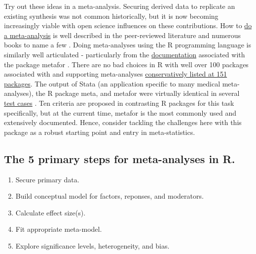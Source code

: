 \documentclass[
]{book}
\providecommand{\tightlist}{%
  \setlength{\itemsep}{0pt}\setlength{\parskip}{0pt}}
\begin{document}
Try out these ideas in a meta-analysis. Securing derived data to replicate an existing synthesis was not common historically, but it is now becoming increasingly viable with open science influences on these contributions. How to \href{https://bpspsychub.onlinelibrary.wiley.com/doi/epdf/10.1348/000711010X502733}{do a meta-analysis} is well described in the peer-reviewed literature \citep{RN4836} and numerous books to name a few \citep{RN2185}. Doing meta-analyses using the R programming language is similarly well articulated - particularly from the \href{https://www.metafor-project.org/doku.php}{documentation} associated with the package metafor \citep{RN6175}. There are no bad choices in R with well over 100 packages associated with and supporting meta-analyses \href{https://cran.r-project.org/web/views/MetaAnalysis.html}{conservatively listed at 151 packages}. The output of Stata (an application specific to many medical meta-analyses), the R package meta, and metafor were virtually identical in several \href{https://onlinelibrary.wiley.com/doi/full/10.1002/ece3.6747}{test cases} \citep{RN6974}. Ten criteria are proposed in contrasting R packages for this task specifically, but at the current time, metafor is the most commonly used and extensively documented. Hence, consider tackling the challenges here with this package as a robust starting point and entry in meta-statistics.

\hypertarget{the-5-primary-steps-for-meta-analyses-in-r.}{%
\subsection*{The 5 primary steps for meta-analyses in R.}\label{the-5-primary-steps-for-meta-analyses-in-r.}}

\begin{enumerate}
\def\labelenumi{\arabic{enumi}.}
\tightlist
\item
  Secure primary data.\\
\item
  Build conceptual model for factors, reponses, and moderators.
\item
  Calculate effect size(s).\\
\item
  Fit appropriate meta-model.\\
\item
  Explore significance levels, heterogeneity, and bias.
\end{enumerate}
\end{document}
